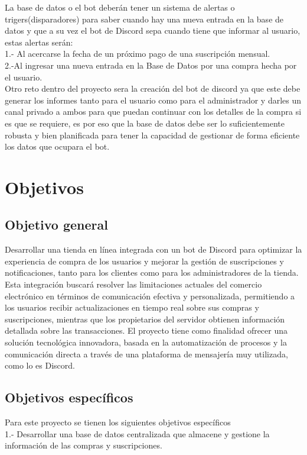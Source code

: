 \documentclass[a4paper,12pt]{article}
\begin{document}
La base de datos o el bot deberán tener un sistema de alertas o trigers(disparadores) para saber cuando hay una nueva entrada en la base de datos y que a su vez el bot de Discord sepa cuando tiene que informar al usuario, estas alertas serán: \\
1.- Al acercarse la fecha de un próximo pago de una suscripción mensual.\\
2.-Al ingresar una nueva entrada en la Base de Datos por una compra hecha por el usuario.\\

Otro reto dentro del proyecto sera la creación del bot de discord ya que este debe generar los informes tanto para el usuario como para el administrador y darles un canal privado a ambos para que puedan continuar con los detalles de la compra si es que se requiere, es por eso que la base de datos debe ser lo suficientemente robusta y bien planificada para tener la capacidad de gestionar de forma eficiente los datos que ocupara el bot.

\newpage

\section{Objetivos}
\subsection{Objetivo general}
Desarrollar una tienda en línea integrada con un bot de Discord para optimizar la experiencia de compra de los usuarios y mejorar la gestión de suscripciones y notificaciones, tanto para los clientes como para los administradores de la tienda. Esta integración buscará resolver las limitaciones actuales del comercio electrónico en términos de comunicación efectiva y personalizada, permitiendo a los usuarios recibir actualizaciones en tiempo real sobre sus compras y suscripciones, mientras que los propietarios del servidor obtienen información detallada sobre las transacciones. El proyecto tiene como finalidad ofrecer una solución tecnológica innovadora, basada en la automatización de procesos y la comunicación directa a través de una plataforma de mensajería muy utilizada, como lo es Discord.\\

\subsection{Objetivos específicos}
Para este proyecto se tienen los siguientes objetivos específicos \\
1.- Desarrollar una base de datos centralizada que almacene y gestione la información de las compras y suscripciones.\\
\end{document}
